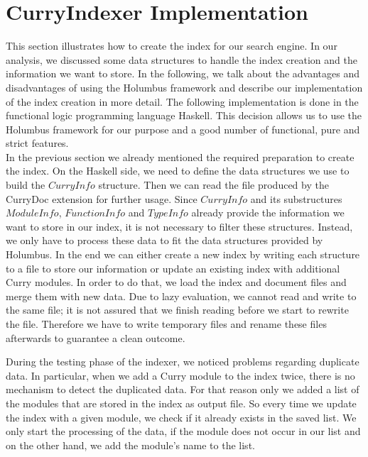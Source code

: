 \documentclass[%
	pdftex,%
	a4paper,%
	oneside,%
	chapterprefix,%
	headsepline,%
	12pt%
]{scrbook}
\newcommand{\Conid}[1]{\mathit{#1}}
\begin{document}
\section{CurryIndexer Implementation}\label{implementation:index}

This section illustrates how to create the index for our search
engine. %
In our analysis, we discussed some data structures to handle the index
creation and the information we want to store. %
In the following, we talk about the advantages and disadvantages of
using the Holumbus framework and describe our implementation of the
index creation in more detail. %
The following implementation is done in the functional logic
programming language Haskell. %
This decision allows us to use the Holumbus framework for our purpose
and a good number of functional, pure and strict features.\\

In the previous section we already mentioned the required preparation
to create the index. %
On the Haskell side, we need to define the data structures we use to
build the \ensuremath{\Conid{CurryInfo}} structure. %
Then we can read the file produced by the CurryDoc extension for
further usage. %
Since \ensuremath{\Conid{CurryInfo}} and its substructures \ensuremath{\Conid{ModuleInfo}}, \ensuremath{\Conid{FunctionInfo}}
and \ensuremath{\Conid{TypeInfo}} already provide the information we want to store in our
index, it is not necessary to filter these structures. %
Instead, we only have to process these data to fit the data structures
provided by Holumbus. %
In the end we can either create a new index by writing each structure
to a file to store our information or update an existing index with
additional Curry modules. %
In order to do that, we load the index and document files and merge
them with new data. %
Due to lazy evaluation, we cannot read and write to the same file; it
is not assured that we finish reading before we start to rewrite the
file. %
Therefore we have to write temporary files and rename these files
afterwards to guarantee a clean outcome.

During the testing phase of the indexer, we noticed problems regarding
duplicate data. %
In particular, when we add a Curry module to the index twice, there is
no mechanism to detect the duplicated data. %
For that reason only we added a list of the modules that are stored in
the index as output file. %
So every time we update the index with a given module, we check if it
already exists in the saved list. %
We only start the processing of the data, if the module does not occur
in our list and on the other hand, we add the module's name to the
list.\\
\end{document}
